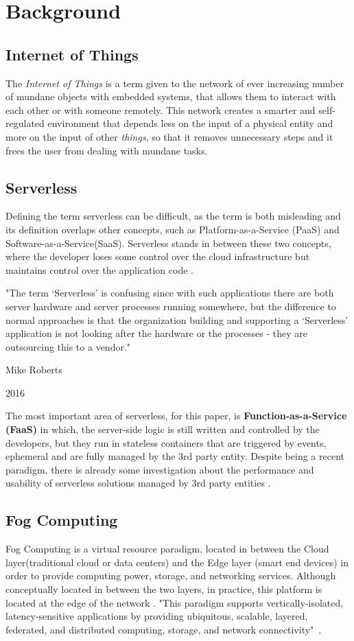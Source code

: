 \section{Background}

\subsection{Internet of Things}\label{sec:dialecto}
The \textit{Internet of Things} is a term given to the network of ever increasing
number of mundane objects with embedded systems, that allows them to interact with
each other or with someone remotely. This network creates a smarter and
self-regulated environment that depends less on the input of a physical entity and
more on the input of other \textit{things}, so that it removes unnecessary steps
and it frees the user from dealing with mundane tasks.

\subsection{Serverless}
Defining the term serverless can be difficult, as the term is both misleading and
its definition overlaps other concepts, such as Platform-as-a-Service (PaaS) and
Software-as-a-Service(SaaS). Serverless stands in between these two concepts, where
the developer loses some control over the cloud infrastructure but maintains
control over the application code \cite{kn:Baldini}.

"The term ‘Serverless’ is confusing since with such applications there are both
server hardware and server processes running somewhere, but the difference to
normal approaches is that the organization building and supporting a ‘Serverless’ application is not looking after the hardware or the processes - they are outsourcing this to a vendor." 

\hfill Mike Roberts

\hfill 2016

The most important area of serverless, for this paper, is
\textbf{Function-as-a-Service (FaaS)} in which, the server-side logic is still
written and controlled by the developers, but they run in stateless containers
that are triggered by events, ephemeral and are fully managed by the 3rd party
entity. Despite being a recent paradigm, there is already some investigation about
the performance and usability of serverless solutions managed by 3rd party
entities \cite{kn:Lee}.

\subsection{Fog Computing}
Fog Computing is a virtual resource paradigm, located in between the Cloud
layer(traditional cloud or data centers) and the Edge layer (smart end devices) in
order to provide computing power, storage, and networking services. Although
conceptually located in between the two layers, in practice, this platform is located at the
edge of the network \cite{kn:Bonomi}. "This paradigm supports vertically-isolated,
latency-sensitive applications by providing ubiquitous, scalable, layered,
federated, and distributed computing, storage, and network connectivity"~\cite{kn:Iorga2017}. 



